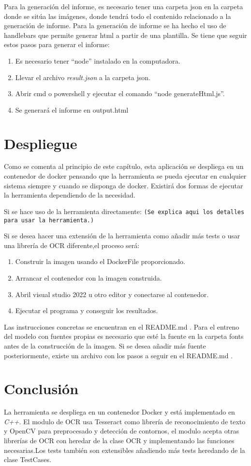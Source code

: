 Para la generación del informe, es necesario tener una carpeta json en la carpeta donde se sitúa las imágenes, donde tendrá todo el contenido relacionado a la generación de informe. Para la generación de informe se ha hecho el uso de handlebars que permite generar html a partir de una plantilla. Se tiene que seguir estos pasos para generar el informe:
\begin{enumerate}
	\item Es necesario tener ``node'' instalado en la computadora.
	\item Llevar el archivo \textit{result.json} a la carpeta json.
	\item Abrir cmd o powershell y ejecutar el comando ``node generateHtml.js''.
	\item Se generará el informe en output.html
\end{enumerate}
\section{Despliegue}
Como se comenta al principio de este capítulo, esta aplicación se despliega en un contenedor de docker pensando que la herramienta se pueda ejecutar en cualquier sistema siempre y cuando se disponga de docker.
Existirá dos formas de ejecutar la herramienta dependiendo de la necesidad.

Si se hace uso de la herramienta directamente:
\texttt{(Se explica aqui los detalles para usar la herramienta.)}

Si se desea hacer una extensión de la herramienta como añadir más tests o usar una librería de OCR diferente,el proceso será:
\begin{enumerate}
	\item Construir la imagen usando el DockerFile proporcionado.
	\item Arrancar el contenedor con la imagen construida.
	\item Abril visual studio 2022 u otro editor y conectarse al contenedor.
	\item Ejecutar el programa y conseguir los resultados.
\end{enumerate}
Las instrucciones concretas se encuentran en el README.md .
Para el entreno del modelo con fuentes propias es necesario que esté la fuente en la carpeta fonts antes de la construcción de la imagen. Si se desea añadir más fuente posteriormente, existe un archivo con los pasos a seguir en el README.md .


\section{Conclusión}
La herramienta se despliega en un contenedor Docker y está implementado en \emph{C++}. El modulo de OCR usa Tesseract como librería de reconocimiento de texto y OpenCV para preprocesado y detección de contornos, el modulo acepta otras librerías de OCR con heredar de la clase OCR y implementando las funciones necesarias.Los tests también son extensibles añadiendo más tests heredando de la clase TestCases.

